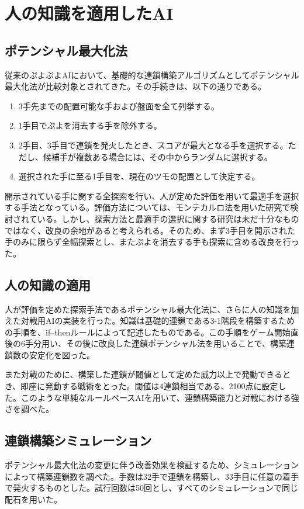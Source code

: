 \documentclass[twocolumn, a4paper]{UECIEresume}
\begin{document}
\section{人の知識を適用したAI}
\subsection{ポテンシャル最大化法}
従来のぷよぷよAIにおいて、基礎的な連鎖構築アルゴリズムとしてポテンシャル最大化法が比較対象とされてきた\cite{puyo_monte, puyo_temp}。その手続きは、以下の通りである。
\begin{enumerate}
\item 3手先までの配置可能な手および盤面を全て列挙する。
\item 1手目でぷよを消去する手を除外する。
\item 2手目、3手目で連鎖を発火したとき、スコアが最大となる手を選択する。ただし、候補手が複数ある場合には、その中からランダムに選択する。
\item 選択された手に至る1手目を、現在のツモの配置として決定する。
\end{enumerate}

開示されている手に関する全探索を行い、人が定めた評価を用いて最適手を選択する手法となっている。評価方法については、モンテカルロ法を用いた研究\cite{puyo_monte}で検討されている。しかし、探索方法と最適手の選択に関する研究は未だ十分なものではなく、改良の余地があると考えられる。そのため、まず3手目を開示された手のみに限らず全幅探索とし、またぷよを消去する手も探索に含める改良を行った。

\subsection{人の知識の適用}
人が評価を定めた探索手法であるポテンシャル最大化法に、さらに人の知識を加えた対戦用AIの実装を行った。知識は基礎的連鎖である3-1階段を構築するための手順を、if--thenルールによって記述したものである。この手順をゲーム開始直後の6手分用い、その後に改良した連鎖ポテンシャル法を用いることで、構築連鎖数の安定化を図った。

また対戦のために、構築した連鎖が閾値として定めた威力以上で発動できるとき、即座に発動する戦術をとった。閾値は4連鎖相当である、2100点に設定した。このような単純なルールベースAIを用いて、連鎖構築能力と対戦における強さを調べた。

\subsection{連鎖構築シミュレーション}
ポテンシャル最大化法の変更に伴う改善効果を検証するため、シミュレーションによって構築連鎖数を調べた。手数は32手で連鎖を構築し、33手目に任意の着手で発火するものとした。試行回数は50回とし、すべてのシミュレーションで同じ配石を用いた。
\end{document}
